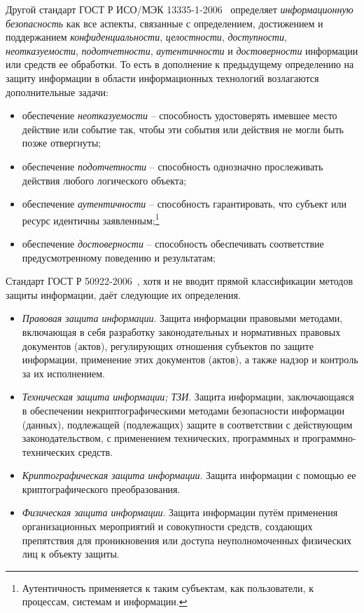 Другой стандарт ГОСТ Р ИСО/МЭК 13335-1-2006~\cite{GOST-13335-1-2006} определяет \emph{информационную безопасность} как все аспекты, связанные с определением, достижением и поддержанием \emph{конфиденциальности}, \emph{целостности}, \emph{доступности}, \emph{неотказуемости}, \emph{подотчетности}, \emph{аутентичности} и \emph{достоверности} информации или средств ее обработки. То есть в дополнение к предыдущему определению на защиту информации в области информационных технологий возлагаются дополнительные задачи:
\begin{itemize}
	\item обеспечение \emph{неотказуемости} -- способность удостоверять имевшее место действие или событие так, чтобы эти события или действия не могли быть позже отвергнуты;
	\item обеспечение \emph{подотчетности} -- способность однозначно прослеживать действия любого логического объекта;
	\item обеспечение \emph{аутентичности} -- способность гарантировать, что субъект или ресурс идентичны заявленным;\footnote{Аутентичность применяется к таким субъектам, как пользователи, к процессам, системам и информации.}
	\item обеспечение \emph{достоверности} -- способность обеспечивать соответствие предусмотренному поведению и результатам;
\end{itemize}

Стандарт ГОСТ Р 50922-2006~\cite{GOST-50922-2006}, хотя и не вводит прямой классификации методов защиты информации, даёт следующие их определения.
\begin{itemize}
	\item \emph{Правовая защита информации}. Защита информации правовыми методами, включающая в себя разработку законодательных и нормативных правовых документов (актов), регулирующих отношения субъектов по защите информации, применение этих документов (актов), а также надзор и контроль за их исполнением.
	\item \emph{Техническая защита информации; ТЗИ}. Защита информации, заключающаяся в обеспечении некриптографическими методами безопасности информации (данных), подлежащей (подлежащих) защите в соответствии с действующим законодательством, с применением технических, программных и программно-технических средств.
	\item \emph{Криптографическая защита информации}. Защита информации с помощью ее криптографического преобразования.
	\item \emph{Физическая защита информации}. Защита информации путём применения организационных мероприятий и совокупности средств, создающих препятствия для проникновения или доступа неуполномоченных физических лиц к объекту защиты.
\end{itemize}

